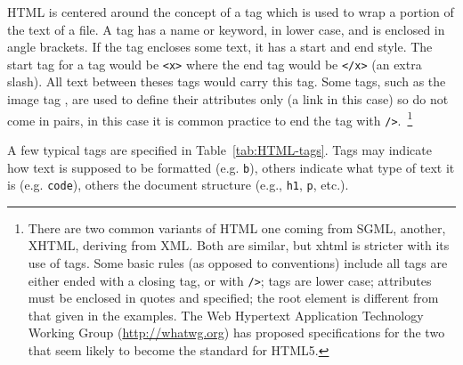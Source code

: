 HTML is centered around the concept of a tag which is used to wrap a
portion of the text of a file. A tag has a name or keyword, in lower
case, and is enclosed in angle brackets. If the tag encloses some
text, it has a start and end style. The start tag for a tag 
would be \verb+<x>+ where the end tag would be \texttt{</x>} (an extra
slash). All text between theses tags would carry this tag. Some tags,
such as the image tag , are used to define their attributes
only (a link in this case) so do not come in pairs, in this case it is
common practice to end the tag with \texttt{/>}.~\footnote{There are
  two common variants of HTML one coming from SGML, another, XHTML, deriving
  from XML. Both are similar, but xhtml is stricter with its use of
  tags. Some basic rules (as opposed to conventions) include all tags
  are either ended with a closing tag, or with \texttt{/>}; tags are
  lower case; attributes must be enclosed in quotes and specified; the
  root element is different from that given in the examples. The
  Web Hypertext Application Technology Working Group
  (\url{http://whatwg.org}) has proposed specifications for the two
  that seem likely to become the standard for HTML5.}

A few typical tags are specified in Table~\ref{tab:HTML-tags}. 
Tags may indicate how text is supposed to be formatted (e.g. \texttt{b}),
others indicate what type of text it is (e.g. \texttt{code}), others
the document structure (e.g., \texttt{h1}, \texttt{p}, etc.).

